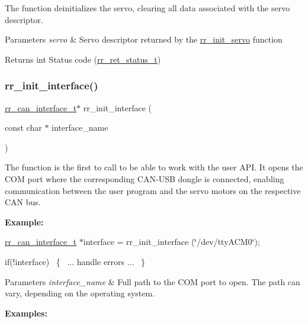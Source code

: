 The function deinitializes the servo, clearing all data associated with the servo descriptor. 


\begin{DoxyParams}{Parameters}
{\em servo} & Servo descriptor returned by the \hyperlink{group___common_ga0adb313a3eeb8a4399431e940a1f3e9e}{rr\+\_\+init\+\_\+servo} function \\
\hline
\end{DoxyParams}
\begin{DoxyReturn}{Returns}
int Status code (\hyperlink{api_8h_a92d5be5038abcf89837faf85a08debdc}{rr\+\_\+ret\+\_\+status\+\_\+t}) 
\end{DoxyReturn}
\mbox{\label{group___common_ga472a4890dcc7d7a13123c56a06946d91}} 
\subsubsection{\texorpdfstring{rr\+\_\+init\+\_\+interface()}{rr\_init\_interface()}}
{\footnotesize\ttfamily \hyperlink{structrr__can__interface__t}{rr\+\_\+can\+\_\+interface\+\_\+t}$\ast$ rr\+\_\+init\+\_\+interface (\begin{DoxyParamCaption}\item[{const char $\ast$}]{interface\+\_\+name }\end{DoxyParamCaption})}



The function is the first to call to be able to work with the user A\+PI. It opens the C\+OM port where the corresponding C\+A\+N-\/\+U\+SB dongle is connected, enabling communication between the user program and the servo motors on the respective C\+AN bus. 

{\bfseries Example\+:}

\hyperlink{structrr__can__interface__t}{rr\+\_\+can\+\_\+interface\+\_\+t} $\ast$interface = rr\+\_\+init\+\_\+interface (\char`\"{}/dev/tty\+A\+C\+M0\char`\"{});

{\ttfamily if(!interface)~\newline
 \{~\newline
 ... handle errors ...~\newline
 \}}


\begin{DoxyParams}{Parameters}
{\em interface\+\_\+name} & Full path to the C\+OM port to open. The path can vary, depending on the operating system. \\
\hline
\end{DoxyParams}
{\bfseries Examples\+:}

